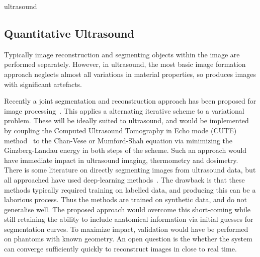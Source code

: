 \documentclass[11pt, a4paper, sans]{moderncv}
\begin{document}
\begin{btUnit}
\begin{btSect}{ultrasound}
\subsection*{Quantitative Ultrasound}
Typically image reconstruction and segmenting objects within the image are performed separately. However, in ultrasound, the most basic image formation approach neglects almost all variations in material properties, so produces images with significant artefacts. 

Recently a \textcolor{custom}{joint segmentation and reconstruction} approach has been proposed for image processing~\cite{budd2023joint}. This applies a alternating iterative scheme to a variational problem. These will be ideally suited to ultrasound, and would be implemented by coupling the Computed Ultrasound Tomography in Echo mode (CUTE) method~\cite{stahli2020improved} to the {Chan-Vese} or {Mumford-Shah} equation via minimizing the Ginzberg-Landau energy in both steps of the scheme. Such an approach would have immediate impact in ultrasound imaging, thermometry and dosimetry. There is some literature on directly segmenting images from ultrasound data, but all approached have used deep-learning methods~\cite{nair2020deep}. The drawback is that these methods typically required training on labelled data, and producing this can be a laborious process. Thus the methods are trained on synthetic data, and do not generalise well. The proposed approach would overcome this short-coming while still retaining the ability to include anatomical information via initial guesses for segmentation curves. To maximize impact, validation would have be performed on phantoms with known geometry. An open question is the whether the system can converge sufficiently quickly to reconstruct images in close to real time.

{\footnotesize\btPrintCited}

\end{btSect}
 
\end{btUnit} 

\end{document}
